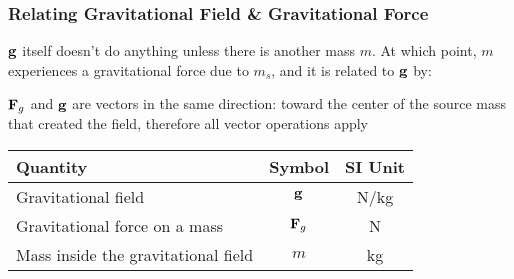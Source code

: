 \documentclass[12pt,compress,aspectratio=169]{beamer}
\newcommand{\mb}[1]{\ensuremath\mathbf{#1}}
\newcommand{\eq}[2]{\vspace{#1}{\Large\begin{displaymath}#2\end{displaymath}}}
\begin{document}
\begin{frame}
  \frametitle{Relating Gravitational Field \& Gravitational Force}

  $\mb{g}$ itself doesn't do anything unless there is another mass $m$. At
  which point, $m$ experiences a gravitational force due to $m_s$, and it is
  related to $\mb{g}$ by:

  \eq{-.2in}{
    \boxed{\mb{F}=m\mb{g}}
  }
  
  $\mb{F}_g$ and  $\mb{g}$ are vectors in the same direction: toward the
  center of the source mass that created the field, therefore all vector
  operations apply

  \begin{center}
    \begin{tabular}{l|c|c}
      \rowcolor{pink}
      \textbf{Quantity} & \textbf{Symbol} & \textbf{SI Unit} \\ \hline
      Gravitational field & $\mb{g}$   & \si{N/kg}\\
      Gravitational force on a mass & $\mb{F}_g$ & \si{N} \\
      Mass inside the gravitational field & $m$ & \si{kg} \\
    \end{tabular}
  \end{center}
\end{frame}
\end{document}
